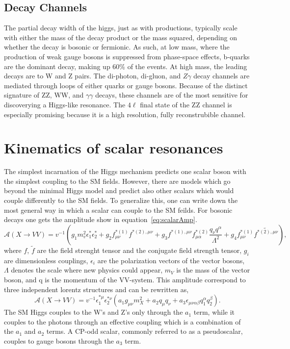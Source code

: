 \subsection{Decay Channels}
\label{sec:HiggsDecays}

The partial decay width of the higgs, just as with productions, typically 
scale with either the mass of the decay product or the mass squared, 
depending on whether the decay is bosonic or fermionic.  As such, at low 
mass, where the production of weak gauge bosons is suppressed from 
phase-space effects, b-quarks are the dominant decay, making up $60\%$ of 
the events.  At high mass, the leading decays are to W and Z pairs.  The 
di-photon, di-gluon, and $Z\gamma$ decay channels are mediated through loops 
of either quarks or gauge bosons.  Because of the distinct signature of ZZ,
WW, and $\gamma\gamma$ decays, these channels are of the most sensitive for 
discoverying a Higgs-like resonance.  The $4\ell$ final state of the ZZ 
channel is especially promising because it is a high resolution, fully 
reconstrubible channel.  

\section{Kinematics of scalar resonances}
\label{sec:Kinematics of scalar resonances}

The simplest incarnation of the Higgs mechanism predicts one scalar 
boson with the simplest coupling to the SM fields.  However, there are 
models which go beyond the minimal Higgs model and predict also other scalars
which would couple differently to the SM fields.  To generalize this, one 
can write down the most general way in which a scalar can couple to the SM
feilds.  For bosonic decays one gets the amplitude show in 
equation~\ref{eq:scalarAmp}.  
\begin{equation}
  \mathscr{A}(X\to VV) = v^{-1}(g_1m_v^2\epsilon_1^*\epsilon_2^*+g_2f_{\mu\nu}^{*(1)}f^{*(2),\mu\nu}+g_3f^{*(1),\mu\nu}f_{\mu\alpha}^{*(2)}\frac{q_\nu q^\alpha}{\Lambda^2}+g_4f_{\mu\nu}^{*(1)}\tilde{f^{*(2),\mu\nu}}),
\label{eq:scalarAmp}
\end{equation}
where $f$, $\tilde{f}$ are the field strenght tensor and the conjugate field
strength tensor, $g_i$ are dimensionless couplings, $\epsilon_i$ are the 
polarization vectors of the vector bosons, $\Lambda$ denotes the scale where new
physics could appear, $m_V$ is the mass of the vector boson, and q is the
momentum of the VV-system.  
This amplitude correspond to three independent
lorentz structures and can be rewritten as,
\begin{equation}
\mathscr{A}(X\to VV) = v^{-1}\epsilon_1^{*\mu}\epsilon_2^{*\nu}(a_1g_{\mu\nu}m_X^2+a_2q_\mu q_\nu+a_3\epsilon_{\mu\nu\alpha\beta}q_1^{\alpha}q_2^{\beta}). 
\end{equation}
The SM Higgs couples to the W's and Z's only through the $a_1$ term,
while it couples to the photons through an effective coupling which is a 
combination of the $a_1$ and $a_2$ terms.  A CP-odd scalar, commonly referred 
to as a pseudoscalar, couples to gauge bosons through the $a_3$ term.

